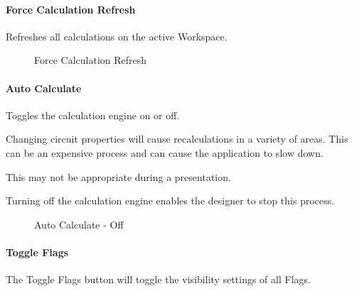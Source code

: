\documentclass[letterpaper,10pt,english]{sphinxmanual}
\begin{document}
\paragraph{Force Calculation Refresh}
\label{\detokenize{docs/userguide/explorersandutilitytools/statusbar/index-status_bar:force-calculation-refresh}}\label{\detokenize{docs/userguide/explorersandutilitytools/statusbar/index-status_bar:id6}}
Refreshes all calculations on the active Workspace.

\begin{figure}[H]
\centering
\capstart

\noindent{}
\caption{Force Calculation Refresh}\label{\detokenize{docs/userguide/explorersandutilitytools/statusbar/index-status_bar:id9}}\end{figure}


\paragraph{Auto Calculate}
\label{\detokenize{docs/userguide/explorersandutilitytools/statusbar/index-status_bar:auto-calculate}}\label{\detokenize{docs/userguide/explorersandutilitytools/statusbar/index-status_bar:auto-calulate}}
Toggles the calculation engine on or off.

Changing circuit properties will cause recalculations in a variety of areas.  This can be an expensive process and can cause the application to slow down.

This may not be appropriate during a presentation.

Turning off the calculation engine enables the designer to stop this process.

\begin{figure}[H]
\centering
\capstart

\noindent{}
\caption{Auto Calculate - Off}\label{\detokenize{docs/userguide/explorersandutilitytools/statusbar/index-status_bar:id10}}\end{figure}

\ignorespaces 

\paragraph{Toggle Flags}
\label{\detokenize{docs/userguide/explorersandutilitytools/statusbar/index-status_bar:toggle-flags}}\label{\detokenize{docs/userguide/explorersandutilitytools/statusbar/index-status_bar:index-0}}\label{\detokenize{docs/userguide/explorersandutilitytools/statusbar/index-status_bar:id7}}
The Toggle Flags button will toggle the visibility settings of all Flags.
\end{document}
